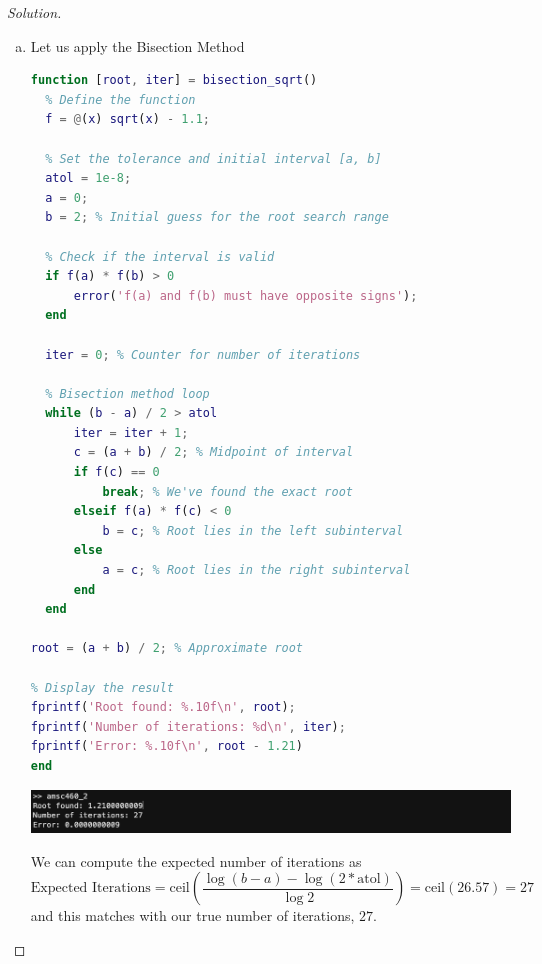 \documentclass[12pt]{scrartcl}
\begin{document}
\begin{proof}[Solution]
  \hfill

  \begin{enumerate}[(a)]
    \item Let us apply the Bisection Method 
    
    \begin{lstlisting}[language=Matlab]
function [root, iter] = bisection_sqrt()
  % Define the function
  f = @(x) sqrt(x) - 1.1;
  
  % Set the tolerance and initial interval [a, b]
  atol = 1e-8;
  a = 0;
  b = 2; % Initial guess for the root search range
  
  % Check if the interval is valid
  if f(a) * f(b) > 0
      error('f(a) and f(b) must have opposite signs');
  end
  
  iter = 0; % Counter for number of iterations
  
  % Bisection method loop
  while (b - a) / 2 > atol
      iter = iter + 1;
      c = (a + b) / 2; % Midpoint of interval
      if f(c) == 0
          break; % We've found the exact root
      elseif f(a) * f(c) < 0
          b = c; % Root lies in the left subinterval
      else
          a = c; % Root lies in the right subinterval
      end
  end

root = (a + b) / 2; % Approximate root

% Display the result
fprintf('Root found: %.10f\n', root);
fprintf('Number of iterations: %d\n', iter);
fprintf('Error: %.10f\n', root - 1.21)
end
    \end{lstlisting}

    \includegraphics[width=13cm]{root_found.png}

    We can compute the expected number of iterations as 
    \[\text{Expected Iterations} = \text{ceil}\left( \frac{\log(b-a) - \log(2 * \text{atol})}{\log 2}\right) = \text{ceil}(26.57) = 27\]
    and this matches with our true number of iterations, $27$. 


\end{enumerate}
\end{proof}
\end{document}
